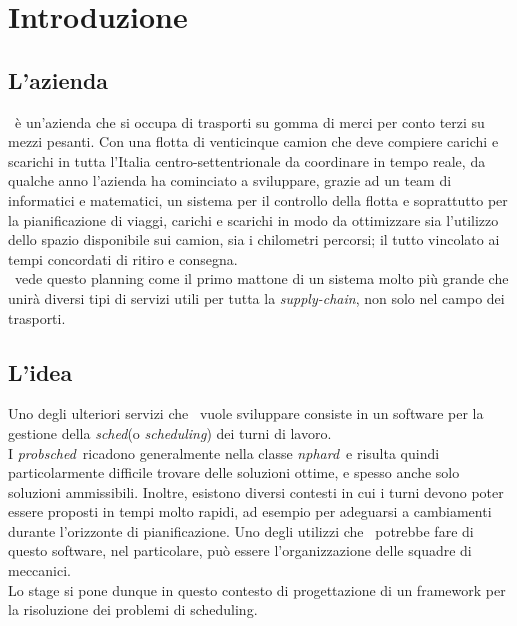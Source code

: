 
\chapter{Introduzione}
\label{cap:introduzione}


\section{L'azienda}

\TS\ è un'azienda che si occupa di trasporti su gomma di merci per conto terzi su mezzi pesanti. Con una flotta di venticinque camion che deve compiere carichi e scarichi in tutta l'Italia centro-settentrionale da coordinare in tempo reale, da qualche anno l'azienda ha cominciato a sviluppare, grazie ad un team di informatici e matematici, un sistema per il controllo della flotta e soprattutto per la pianificazione di viaggi, carichi e scarichi in modo da ottimizzare sia l'utilizzo dello spazio disponibile sui camion, sia i chilometri percorsi; il tutto vincolato ai tempi concordati di ritiro e consegna. \\
\TS\ vede questo planning come il primo mattone di un sistema molto più grande che unirà diversi tipi di servizi utili per tutta la \emph{\gls{supply-chain}}\glsfirstoccur, non solo nel campo dei trasporti.

\section{L'idea}

Uno degli ulteriori servizi che \TS\ vuole sviluppare consiste in un software per la gestione della \emph{\gls{sched}}\glsfirstoccur (o \textit{scheduling}) dei turni di lavoro. \\ I \emph{\gls{probsched}}\glsfirstoccur\ ricadono generalmente nella classe \emph{\gls{nphard}}\glsfirstoccur\ e risulta quindi particolarmente difficile trovare delle soluzioni ottime, e spesso anche solo soluzioni ammissibili. Inoltre, esistono diversi contesti in cui i turni devono poter essere proposti in tempi molto rapidi, ad esempio per adeguarsi a cambiamenti durante l’orizzonte di pianificazione. Uno degli utilizzi che \TS\ potrebbe fare di questo software, nel particolare, può essere l'organizzazione delle squadre di meccanici. \\
Lo stage si pone dunque in questo contesto di progettazione di un framework per la risoluzione dei problemi di scheduling.

